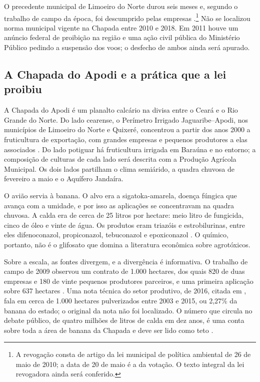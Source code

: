 O precedente municipal de Limoeiro do Norte durou seis meses e, segundo o
trabalho de campo da época, foi descumprido pelas empresas
\cite[p.~536--542]{teixeira2011rebulico}.\footnote{A revogação consta de artigo
da lei municipal de política ambiental de 26 de maio de 2010; a data de 20 de
maio é a da votação. O texto integral da lei revogadora ainda será conferido.}
Não se localizou norma municipal vigente na Chapada entre 2010 e 2018. Em 2011
houve um anúncio federal de proibição na região e uma ação civil pública do
Ministério Público pedindo a suspensão dos voos; o desfecho de ambos ainda será
apurado.

\subsection{A Chapada do Apodi e a prática que a lei proibiu}

A Chapada do Apodi é um planalto calcário na divisa entre o Ceará e o Rio
Grande do Norte. Do lado cearense, o Perímetro Irrigado Jaguaribe--Apodi, nos
municípios de Limoeiro do Norte e Quixeré, concentrou a partir dos anos 2000 a
fruticultura de exportação, com grandes empresas e pequenos produtores a elas
associados \cite{marinho2011dimensao, aguiar2017}. Do lado potiguar há
fruticultura irrigada em Baraúna e no entorno; a composição de culturas de cada
lado será descrita com a Produção Agrícola Municipal. Os dois lados partilham o clima
semiárido, a quadra chuvosa de fevereiro a maio e o Aquífero Jandaíra.

O avião servia à banana. O alvo era a sigatoka-amarela, doença fúngica que
avança com a umidade, e por isso as aplicações se concentravam na quadra
chuvosa. A calda era de cerca de 25 litros por hectare: meio litro de
fungicida, cinco de óleo e vinte de água. Os produtos eram triazóis e
estrobilurinas, entre eles difenoconazol, propiconazol, tebuconazol e
epoxiconazol \cite[p.~526]{teixeira2011rebulico}. O químico, portanto, não é o
glifosato que domina a literatura econômica sobre agrotóxicos.

Sobre a escala, as fontes divergem, e a divergência é informativa. O trabalho de
campo de 2009 observou um contrato de 1.000 hectares, dos quais 820 de duas
empresas e 180 de vinte pequenos produtores parceiros, e uma primeira aplicação
sobre 637 hectares \cite[p.~171--173]{marinho2011dimensao}. Uma nota técnica do
setor produtivo, de 2016, citada em , fala em cerca de
1.000 hectares pulverizados entre 2003 e 2015, ou 2,27\% da banana do estado; o
original da nota não foi localizado. O número
que circula no debate público, de quatro milhões de litros de calda em dez
anos, é uma conta sobre toda a área de banana da Chapada e deve ser lido como
teto \cite[p.~527]{teixeira2011rebulico}.

